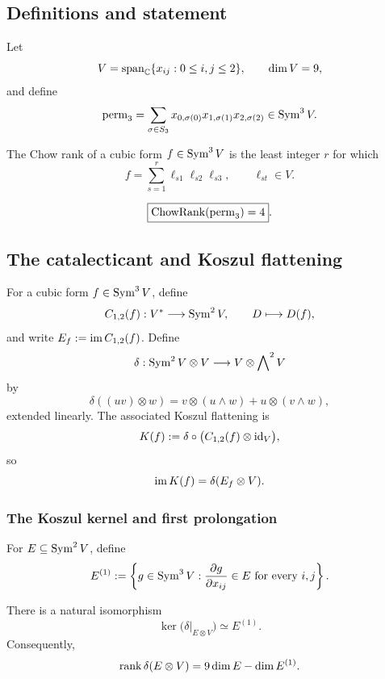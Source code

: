 \subsection{Definitions and statement}

Let
\[
  V=\operatorname{span}_{\mathbb C}\{x_{ij}:0\leq i,j\leq2\},\qquad \dim V=9,
\]
and define
\[
  \operatorname{perm}_3=\sum_{\sigma\in S_3}
  x_{0,\sigma(0)}x_{1,\sigma(1)}x_{2,\sigma(2)}\in\operatorname{Sym}^3V.
\]

\begin{definition}
The Chow rank of a cubic form \(f\in\operatorname{Sym}^3V\) is the least integer \(r\)
for which
\[
  f=\sum_{s=1}^{r}\ell_{s1}\ell_{s2}\ell_{s3},
  \qquad \ell_{st}\in V.
\]
\end{definition}

\begin{theorem}\label{n3:thm:main}
\[
  \boxed{\operatorname{ChowRank}(\operatorname{perm}_3)=4}.
\]
\end{theorem}

\subsection{The catalecticant and Koszul flattening}

For a cubic form \(f\in\operatorname{Sym}^3V\), define
\[
  C_{1,2}(f):V^*\longrightarrow\operatorname{Sym}^2V,
  \qquad D\longmapsto D(f),
\]
and write \(E_f:=\operatorname{im} C_{1,2}(f)\). Define
\[
  \delta:\operatorname{Sym}^2V\otimes V\longrightarrow V\otimes\bigwedge\nolimits^2V
\]
by
\begin{equation}\label{n3:eq:delta}
  \delta((uv)\otimes w)
  =v\otimes(u\wedge w)+u\otimes(v\wedge w),
\end{equation}
extended linearly. The associated Koszul flattening is
\[
  K(f):=\delta\circ\bigl(C_{1,2}(f)\otimes\operatorname{id}_V\bigr),
\]
so
\begin{equation}\label{n3:eq:image}
  \operatorname{im} K(f)=\delta(E_f\otimes V).
\end{equation}

\subsubsection{The Koszul kernel and first prolongation}

For \(E\subseteq\operatorname{Sym}^2V\), define
\[
  E^{(1)}:=\left\{g\in\operatorname{Sym}^3V:
  \frac{\partial g}{\partial x_{ij}}\in E
  \text{ for every }i,j\right\}.
\]

\begin{lemma}\label{n3:lem:kernel-prolongation}
There is a natural isomorphism
\[
  \ker\bigl(\delta|_{E\otimes V}\bigr)\simeq E^{(1)}.
\]
Consequently,
\[
  \operatorname{rank}\delta(E\otimes V)=9\dim E-\dim E^{(1)}.
\]
\end{lemma}

